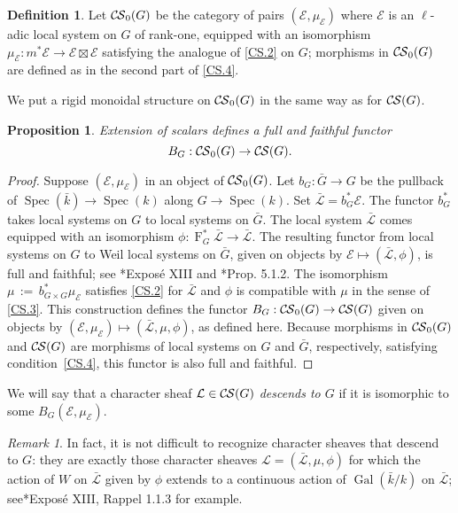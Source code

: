 \documentclass[10pt]{amsart}
\theoremstyle{plain}
\newtheorem{proposition}[theorem]{Proposition}
\theoremstyle{definition}
\newtheorem{definition}[theorem]{Definition}
\theoremstyle{remark}
\newtheorem{remark}[theorem]{Remark}
\newcommand{\bFq}{\bar{k}}
\newcommand{\Fq}{k}
\DeclareMathOperator{\Gal}{Gal}
\newcommand{\Frob}[1]{\operatorname{F}_{#1}}
\newcommand{\Spec}[1]{{\operatorname{Spec}(#1)}}
\newcommand{\ceq}{{\, :=\, }}
\newcommand{\cs}[1]{{\mathcal{#1}}}
\newcommand{\gcs}[1]{{\mathcal{\bar #1}}}
\newcommand{\CS}{{\mathcal{C\hskip-0.8pt S}}}
\newcommand{\bCS}{{\CS_0}}
\newcommand{\bG}{\bar{G}}
\begin{document}
\begin{definition}
Let $\bCS(G)$ be the category of pairs $(\cs{E},\mu_\cs{E})$
where $\cs{E}$ is an $\ell$-adic local system on $G$ of rank-one,
equipped with an isomorphism $\mu_\cs{E} : m^* \cs{E} \to \cs{E} \boxtimes \cs{E}$
satisfying the analogue of \ref{CS.2} on $G$;
morphisms in $\bCS(G)$ are defined as in the second part of
\ref{CS.4}. 
\end{definition}

We put a rigid monoidal structure on $\bCS(G)$ in the same way as for $\CS(G)$.

\begin{proposition}\label{prop:BG}
Extension of scalars defines a full and faithful functor
\[
B_G : \bCS(G) \to \CS(G).
\]
\end{proposition}

\begin{proof}
 Suppose $(\cs{E},\mu_\cs{E})$ in an object of $\bCS(G)$.
 Let $b_G : \bG \to G$ be the pullback of $\Spec{\bFq} \to \Spec{\Fq}$ along $G\to \Spec{\Fq}$.
 Set $\gcs{L} = b_G^* \cs{E}$. 
 The functor $b_G^*$ takes local systems on $G$ to local systems on $\bG$.
 The local system $\gcs{L}$ comes equipped with an isomorphism
 $\phi: \Frob{G}^* \gcs{L} \to \gcs{L}$.
 The resulting functor from local systems on $G$ to Weil local systems on $\bG$, given on objects by $\cs{E} \mapsto (\gcs{L},\phi)$, 
 is full and faithful; see \cite{deligne-katz:SGA7.2}*{Expos\'e XIII} and \cite{beilinson-bernstein-deligne:81a}*{Prop. 5.1.2}.
 The isomorphism $\mu \ceq b_{G\times G}^*\mu_\cs{E}$ satisfies \ref{CS.2}
 for $\gcs{L}$ and $\phi$ is compatible with $\mu$ in the sense of \ref{CS.3}.
 This construction defines the functor $B_G : \bCS(G) \to \CS(G)$ given on objects by $(\cs{E},\mu_\cs{E}) \mapsto (\gcs{L},\mu, \phi)$, as defined here. 
 Because morphisms in $\bCS(G)$ and $\CS(G)$ are morphisms of local systems on $G$ and $\bG$, respectively, satisfying condition~\ref{CS.4}, this functor is also full and faithful.
\end{proof}

We will say that a character sheaf $\cs{L} \in \CS(G)$ \emph{descends to $G$} if it is isomorphic to some $B_G(\cs{E}, \mu_\cs{E})$.

\begin{remark}\label{rem:descent}
In fact, it is not difficult to recognize character sheaves that descend to $G$: they are exactly those character sheaves $\cs{L} = (\gcs{L},\mu,\phi)$ for which the action of $W$ on $\gcs{L}$ given by $\phi$ extends to a continuous action of $\Gal(\bFq/\Fq)$ on $\gcs{L}$; see\cite{deligne-katz:SGA7.2}*{Expos\'e XIII, Rappel 1.1.3} for example. 
\end{remark}
\end{document}
